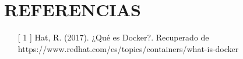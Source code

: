 \section{REFERENCIAS} 

\begin{itemize}
	\item [[ 1]] Hat, R. (2017). ¿Qué es Docker?. Recuperado de https://www.redhat.com/es/topics/containers/what-is-docker
	
\end{itemize}


